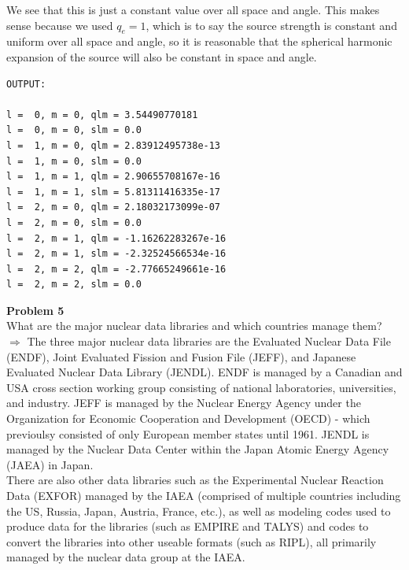 \documentclass[10pt]{article}
\begin{document}
We see that this is just a constant value over all space and angle. This makes sense because we used $q_e = 1$, which is to say the source strength is constant and uniform over all space and angle, so it is reasonable that the spherical harmonic expansion of the source will also be constant in space and angle.\\




\begin{lstlisting}[numbers=none]
OUTPUT:

l =  0, m = 0, qlm = 3.54490770181
l =  0, m = 0, slm = 0.0
l =  1, m = 0, qlm = 2.83912495738e-13
l =  1, m = 0, slm = 0.0
l =  1, m = 1, qlm = 2.90655708167e-16
l =  1, m = 1, slm = 5.81311416335e-17
l =  2, m = 0, qlm = 2.18032173099e-07
l =  2, m = 0, slm = 0.0
l =  2, m = 1, qlm = -1.16262283267e-16
l =  2, m = 1, slm = -2.32524566534e-16
l =  2, m = 2, qlm = -2.77665249661e-16
l =  2, m = 2, slm = 0.0
\end{lstlisting}






\newpage
\noindent \textbf{Problem 5}\\
What are the major nuclear data libraries and which countries manage them?\\[5pt]

$\Rightarrow$ The three major nuclear data libraries are the Evaluated Nuclear Data File (ENDF), Joint Evaluated Fission and Fusion File (JEFF), and Japanese Evaluated Nuclear Data Library (JENDL). ENDF is managed by a Canadian and USA cross section working group consisting of national laboratories, universities, and industry. JEFF is managed by the Nuclear Energy Agency under the Organization for Economic Cooperation and Development (OECD) - which previoulsy consisted of only European member states until 1961. JENDL is managed by the Nuclear Data Center within the Japan Atomic Energy Agency (JAEA) in Japan.\\

There are also other data libraries such as the Experimental Nuclear Reaction Data (EXFOR) managed by the IAEA (comprised of multiple countries including the US, Russia, Japan, Austria, France, etc.), as well as modeling codes used to produce data for the libraries (such as EMPIRE and TALYS) and codes to convert the libraries into other useable formats (such as RIPL), all primarily managed by the nuclear data group at the IAEA. 
\end{document}
